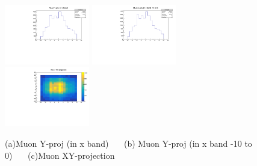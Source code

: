 \documentclass[a4paper,11pt]{article}
\theoremstyle{mytheor}
\begin{document}
\begin{figure}[H] 
\vspace*{-0.3cm} 
\includegraphics[width=0.33\textwidth,scale=0.5,trim=0 0 0 0,clip]{plotsdir/file0_watertower-muYpr2-1.pdf} 
\includegraphics[width=0.33\textwidth,scale=0.5,trim=0 0 0 0,clip]{plotsdir/file0_watertower-muYpr3-1.pdf} 
\includegraphics[width=0.33\textwidth,scale=0.5,trim=0 0 0 0,clip]{plotsdir/file0_watertower-muXYproj-1.pdf} 
\caption{(a)Muon Y-proj (in x band) ~~~(b) Muon Y-proj (in x band -10 to 0) ~~~(c)Muon XY-projection } 
\end{figure} 
\end{document}
